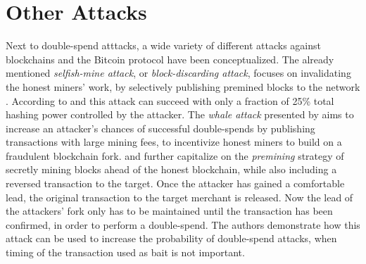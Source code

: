 \documentclass[a4paper,12pt,twoside]{report}
\begin{document}
\section{Other Attacks}
Next to double-spend atttacks, a wide variety of different attacks against blockchains and the Bitcoin protocol have been conceptualized. The already mentioned \textit{selfish-mine attack}, or \textit{block-discarding attack}, focuses on invalidating the honest miners' work, by selectively publishing premined blocks to the network \cite{mwalemodel,selfishmine1,selfishmine2,lessThanHalfDraft}. According to \cite{lessThanHalfDraft} and \cite{selfishmine1} this attack can succeed with only a fraction of 25\% total hashing power controlled by the attacker. The \textit{whale attack} presented by \cite{whaleattack} aims to increase an attacker's chances of successful double-spends by publishing transactions with large mining fees, to incentivize honest miners to build on a fraudulent blockchain fork. \cite{premining1} and \cite{premining2} further capitalize on the \textit{premining} strategy of secretly mining blocks ahead of the honest blockchain, while also including a reversed transaction to the target. Once the attacker has gained a comfortable lead, the original transaction to the target merchant is released. Now the lead of the attackers' fork only has to be maintained until the transaction has been confirmed, in order to perform a double-spend. The authors demonstrate how this attack can be used to increase the probability of double-spend attacks, when timing of the transaction used as bait is not important.
\end{document}
